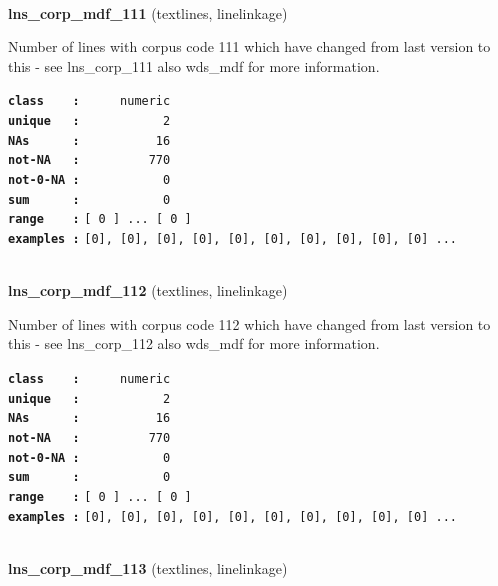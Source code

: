 \documentclass[]{article}
\begin{document}
~

\textbf{lns\_corp\_mdf\_111} (textlines, linelinkage)

Number of lines with corpus code 111 which have changed from last
version to this - see lns\_corp\_111 also wds\_mdf for more information.

\textbf{\texttt{class\ \ \ \ :}} \texttt{~~~~~numeric}\\
\textbf{\texttt{unique\ \ \ :}} \texttt{~~~~~~~~~~~2}\\
\textbf{\texttt{NAs\ \ \ \ \ \ :}} \texttt{~~~~~~~~~~16}\\
\textbf{\texttt{not-NA\ \ \ :}} \texttt{~~~~~~~~~770}\\
\textbf{\texttt{not-0-NA\ :}} \texttt{~~~~~~~~~~~0}\\
\textbf{\texttt{sum\ \ \ \ \ \ :}} \texttt{~~~~~~~~~~~0}\\
\textbf{\texttt{range\ \ \ \ :}}
\texttt{{[}\ 0\ {]}\ ...\ {[}\ 0\ {]}}\\
\textbf{\texttt{examples\ :}}
\texttt{{[}0{]},\ {[}0{]},\ {[}0{]},\ {[}0{]},\ {[}0{]},\ {[}0{]},\ {[}0{]},\ {[}0{]},\ {[}0{]},\ {[}0{]}\ ...}\\

~

\textbf{lns\_corp\_mdf\_112} (textlines, linelinkage)

Number of lines with corpus code 112 which have changed from last
version to this - see lns\_corp\_112 also wds\_mdf for more information.

\textbf{\texttt{class\ \ \ \ :}} \texttt{~~~~~numeric}\\
\textbf{\texttt{unique\ \ \ :}} \texttt{~~~~~~~~~~~2}\\
\textbf{\texttt{NAs\ \ \ \ \ \ :}} \texttt{~~~~~~~~~~16}\\
\textbf{\texttt{not-NA\ \ \ :}} \texttt{~~~~~~~~~770}\\
\textbf{\texttt{not-0-NA\ :}} \texttt{~~~~~~~~~~~0}\\
\textbf{\texttt{sum\ \ \ \ \ \ :}} \texttt{~~~~~~~~~~~0}\\
\textbf{\texttt{range\ \ \ \ :}}
\texttt{{[}\ 0\ {]}\ ...\ {[}\ 0\ {]}}\\
\textbf{\texttt{examples\ :}}
\texttt{{[}0{]},\ {[}0{]},\ {[}0{]},\ {[}0{]},\ {[}0{]},\ {[}0{]},\ {[}0{]},\ {[}0{]},\ {[}0{]},\ {[}0{]}\ ...}\\

~

\textbf{lns\_corp\_mdf\_113} (textlines, linelinkage)
\end{document}
